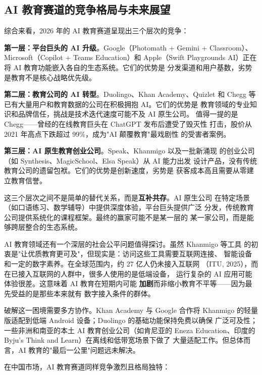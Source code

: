 \subsection{AI 教育赛道的竞争格局与未来展望}
\label{subsec:edu-outlook}

综合来看，2026 年的 AI 教育赛道呈现出三个层次的竞争：

\textbf{第一层：平台巨头的 AI 升级}。Google（Photomath + Gemini +
Classroom）、Microsoft（Copilot + Teams Education）和 Apple（Swift
Playgrounds AI）正在将 AI 教育功能嵌入各自的生态系统。它们的优势是
分发渠道和用户基数，劣势是教育不是核心战略优先级。

\textbf{第二层：教育公司的 AI 转型}。Duolingo、Khan Academy、Quizlet
和 Chegg 等已有大量用户和教育数据的公司在积极拥抱 AI。它们的优势是
教育领域的专业知识和品牌信任，挑战是技术迭代速度可能不及 AI 原生公司。
值得一提的是 Chegg——曾经的在线教育巨头在 ChatGPT 发布后遭受了毁灭性
打击，股价从 2021 年高点下跌超过 99\%，成为"AI 颠覆教育"最戏剧性
的受害者案例。

\textbf{第三层：AI 原生教育创业公司}。Speak、Khanmigo 以及一批新涌现
的创业公司（如 Synthesis、MagicSchool、Elsa Speak）从 AI 能力出发
设计产品，没有传统教育公司的遗留包袱。它们的优势是创新速度，劣势是
获客成本高且需要从零建立教育信誉。

这三个层次之间不是简单的替代关系，而是\textbf{互补共存}。AI 原生公司
在特定场景（如口语练习、数学辅导）中提供深度体验，平台巨头提供广泛
分发，传统教育公司提供系统化的课程框架。最终的赢家可能不是某一层的
某一家公司，而是能够跨层整合的生态系统。

AI 教育领域还有一个深层的社会公平问题值得探讨。虽然 Khanmigo 等工具
的初衷是"让优质教育更可及"，但现实是：访问这些工具需要互联网连接、
智能设备和一定的数字素养。在全球范围内，约 27 亿人仍未接入互联网
（ITU, 2025），而在已接入互联网的人群中，很多人使用的是低端设备，
运行复杂的 AI 应用可能体验很差。这意味着 AI 教育在短期内可能
\textbf{加剧}而非缩小教育不平等——因为最先受益的是那些本来就有
数字接入条件的群体。

破解这一困境需要多方协作。Khan Academy 与 Google 合作将 Khanmigo
的轻量版适配到低端 Android 设备；Duolingo 的基础功能保持免费以确保
广泛可及性；一些非洲和南亚的本土 AI 教育创业公司（如肯尼亚的 Eneza
Education、印度的 Byju's Think and Learn）在离线和低带宽场景下做了
大量适配工作。但总体而言，AI 教育的"最后一公里"问题远未解决。

在中国市场，AI 教育赛道同样竞争激烈且格局独特：


